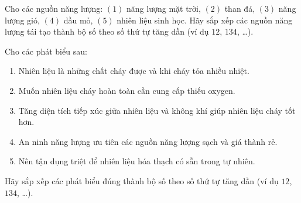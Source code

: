 \documentclass[Main.tex]{subfiles}
\begin{document}
\begin{ex}%
	Cho các nguồn năng lượng: $(1)$ năng lượng mặt trời, $(2)$ than đá, $(3)$ năng lượng gió, $(4)$ dầu mỏ, $(5)$ nhiên liệu sinh học. Hãy sắp xếp các nguồn năng lượng tái tạo thành bộ số theo số thứ tự tăng dần (ví dụ $12$, $134$, …).
\end{ex}

\begin{ex}%
	Cho các phát biểu sau:
	\begin{enumerate}[(1)]
		\item Nhiên liệu là những chất cháy được và khi cháy tỏa nhiều nhiệt.
		\item Muốn nhiên liệu cháy hoàn toàn cần cung cấp thiếu oxygen.
		\item Tăng diện tích tiếp xúc giữa nhiên liệu và không khí giúp nhiên liệu cháy tốt hơn.
		\item An ninh năng lượng ưu tiên các nguồn năng lượng sạch và giá thành rẻ.
		\item Nên tận dụng triệt để nhiên liệu hóa thạch có sẵn trong tự nhiên.
	\end{enumerate}
	Hãy sắp xếp các phát biểu đúng thành bộ số theo số thứ tự tăng dần (ví dụ $12$, $134$, …).
\end{ex}
\end{document}
